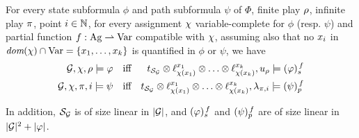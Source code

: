  \begin{proposition}
   \label{prop-redux}
   For every  state subformula $\phi$ and path subformula $\psi$ of
   $\Phi$, finite play $\fplay$, infinite play $\iplay$, point
   $i\in\setn$, for every  assignment $\assign$ variable-complete for
   $\phi$ (resp. $\psi$) and
partial   function $f:\Agf\partialto\Varf$ compatible with $\assign$, assuming
   also that no $\var_i$ in $\dom(\assign)\inter \Varf=\{\var_1,\ldots,\var_k\}$ is
 quantified in $\phi$ or $\psi$, we have
   \begin{align*}
\CGS,\assign,{\fplay}\models\phi && \mbox{iff} &&
  \unfold[\KS_{\CGS}]{\sstate_{\pos_\init}}\prodlab
  \stratlab[\assign(\var_1)]{\var_1}\prodlab\ldots \prodlab
  \stratlab[\assign(\var_k)]{\var_k},\noeud_{\fplay} \modelst
                                                              \tr[f]{\phi}\\
\CGS,\assign,{\iplay},i\models\psi && \mbox{iff} &&
  \unfold[\KS_{\CGS}]{\sstate_{\pos_\init}}\prodlab
  \stratlab[\assign(\var_1)]{\var_1}\prodlab\ldots \prodlab
  \stratlab[\assign(\var_k)]{\var_k},\tpath_{\iplay,i} \modelst
  \trp[f]{\psi}     
   \end{align*}

  In addition, $\KS_{\CGS}$ is of size linear in
$|\CGS|$, and $\tr[f]{\phi}$ and $\trp[f]{\psi}$ are of size linear in $|\CGS|^2+|\phi|$.
 \end{proposition}

